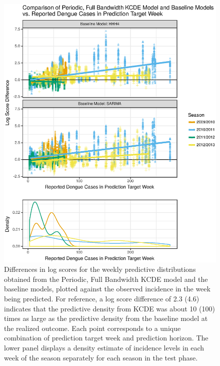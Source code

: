 \documentclass[times, doublespace]{simauth}\usepackage[]{graphicx}\usepackage[]{color}
\makeatletter
\def\maxwidth{ %
  \ifdim\Gin@nat@width>\linewidth
    \linewidth
  \else
    \Gin@nat@width
  \fi
}
\newenvironment{knitrout}{}{} %
\makeatother
\begin{document}
\begin{figure}
\begin{knitrout}
\color{fgcolor}
\includegraphics[width=\maxwidth]{figure/Fig4_Evan_L_Ray_DengueLogScoreDiffVsReportedCasesCombined-1} 

\end{knitrout}
\caption{Differences in log scores for the weekly predictive distributions
obtained from the Periodic, Full Bandwidth KCDE model and the baseline
models, plotted against the observed incidence in the week being predicted.
For reference, a log score difference of 2.3 (4.6) indicates that the predictive density from KCDE was about 10 (100)
times as large as the predictive density from the baseline model at the realized outcome.  Each
point corresponds to a unique combination of prediction target week and
prediction horizon.
The lower panel displays a density estimate of incidence levels in each week
of the season separately for each season in the test phase.
}
\label{fig:DengueLogScoreDiffVsReportedCasesCombined}
\end{figure}
\end{document}
